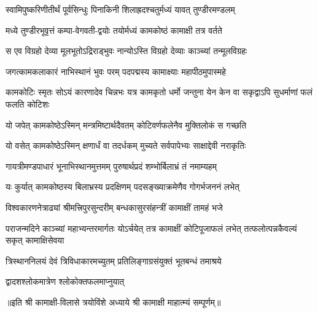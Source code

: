 

\twolineshloka
{स्वामिपुष्करिणीतीर्थं पूर्वसिन्धुः पिनाकिनी}
{शिलाह्रदश्चतुर्मध्यं यावत् तुण्डीरमण्डलम्}

\twolineshloka
{मध्ये तुण्डीरभूवृत्तं कम्पा-वेगवती-द्वयोः}
{तयोर्मध्यं कामकोष्ठं कामाक्षी तत्र वर्तते}

\twolineshloka
{स एव विग्रहो देव्या मूलभूतोऽद्रिराड्भुवः}
{नान्योऽस्ति विग्रहो देव्याः काञ्च्यां तन्मूलविग्रहः}

\twolineshloka
{जगत्कामकलाकारं नाभिस्थानं भुवः परम्}
{पदपद्मस्य कामाक्ष्याः महापीठमुपास्महे}

\threelineshloka
{कामकोटिः स्मृतः सोऽयं कारणादेव चिन्नभः}
{यत्र कामकृतो धर्मो जन्तुना येन केन वा}
{सकृद्वाऽपि सुधर्माणां फलं फलति कोटिशः}

\twolineshloka
{यो जपेत् कामकोष्ठेऽस्मिन् मन्त्रमिष्टार्थदैवतम्}
{कोटिवर्णफलेनैव मुक्तिलोकं स गच्छति}

\twolineshloka
{यो वसेत् कामकोष्ठेऽस्मिन् क्षणार्धं वा तदर्धकम्}
{मुच्यते सर्वपापेभ्यः साक्षाद्देवी नराकृतिः}

\twolineshloka
{गायत्रीमण्डपाधारं भूनाभिस्थानमुत्तमम्}
{पुरुषार्थप्रदं शम्भोर्बिलाभ्रं तं नमाम्यहम्}

\twolineshloka
{यः कुर्यात् कामकोष्ठस्य बिलाभ्रस्य प्रदक्षिणम्}
{पदसङ्ख्याक्रमेणैव गोगर्भजननं लभेत्}

\twolineshloka
{विश्वकारणनेत्राढ्यां श्रीमत्त्रिपुरसुन्दरीम्}
{बन्धकासुरसंहन्त्रीं कामाक्षीं तामहं भजे}

\threelineshloka
{पराजन्मदिने काञ्च्यां महाभ्यन्तरमार्गतः}
{योऽर्चयेत् तत्र कामाक्षीं कोटिपूजाफलं लभेत्}
{तत्फलोत्पन्नकैवल्यं सकृत् कामाक्षिसेवया}

\twolineshloka
{त्रिस्थाननिलयं देवं त्रिविधाकारमच्युतम्}
{प्रतिलिङ्गाग्रसंयुक्तं भूतबन्धं तमाश्रये}

{द्वादशश्लोकमात्रेण श्लोकोक्तफलमाप्नुयात्}

॥इति श्री कामाक्षी-विलासे त्रयोविंशे अध्याये श्री कामाक्षी माहात्म्यं सम्पूर्णम्॥